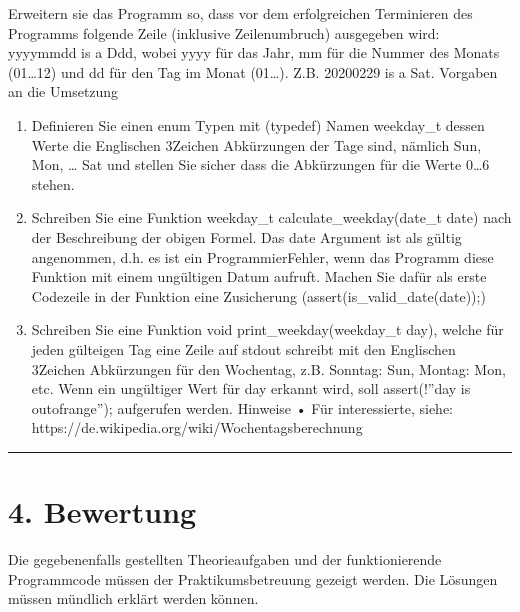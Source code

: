 \documentclass[a4paper,10pt,english]{report}
\begin{document}
\sphinxAtStartPar
Erweitern sie das Programm so, dass vor dem erfolgreichen Terminieren des Programms fol\sphinxhyphen{}gende Zeile (inklusive Zeilenumbruch) ausgegeben wird: yyyy\sphinxhyphen{}mm\sphinxhyphen{}dd is a Ddd, wobei yyyy für das Jahr, mm für die Nummer des Monats (01…12) und dd für den Tag im Monat (01…). Z.B. 2020\sphinxhyphen{}02\sphinxhyphen{}29 is a Sat.
Vorgaben an die Umsetzung
\begin{enumerate}
%
\item {} 
\sphinxAtStartPar
Definieren Sie einen enum Typen mit (typedef) Namen weekday\_t dessen Werte die Englischen 3\sphinxhyphen{}Zeichen Abkürzungen der Tage sind, nämlich Sun, Mon, … Sat und stel\sphinxhyphen{}len Sie sicher dass die Abkürzungen für die Werte 0…6 stehen.

\item {} 
\sphinxAtStartPar
Schreiben Sie eine Funktion weekday\_t calculate\_weekday(date\_t date) nach der Beschreibung der obigen Formel. Das date Argument ist als gültig angenom\sphinxhyphen{}men, d.h. es ist ein Programmier\sphinxhyphen{}Fehler, wenn das Programm diese Funktion mit einem ungültigen Datum aufruft. Machen Sie dafür als erste Codezeile in der Funktion eine Zu\sphinxhyphen{}sicherung (assert(is\_valid\_date(date));)

\item {} 
\sphinxAtStartPar
Schreiben Sie eine Funktion void print\_weekday(weekday\_t day), welche für jeden gülteigen Tag eine Zeile auf stdout schreibt mit den Englischen 3\sphinxhyphen{}Zeichen Ab\sphinxhyphen{}kürzungen für den Wochentag, z.B. Sonntag: Sun, Montag: Mon, etc. Wenn ein ungülti\sphinxhyphen{}ger Wert für day erkannt wird, soll assert(!”day is out\sphinxhyphen{}of\sphinxhyphen{}range”); aufgeru\sphinxhyphen{}fen werden.
Hinweise
•	Für interessierte, siehe: https://de.wikipedia.org/wiki/Wochentagsberechnung

\end{enumerate}


\bigskip\hrule\bigskip



\section{4. Bewertung}
\label{\detokenize{P02_Funktionen_Datentyp_enum/README:bewertung}}
\sphinxAtStartPar
Die gegebenenfalls gestellten Theorieaufgaben und der funktionierende Programmcode müssen der Praktikumsbetreuung gezeigt werden. Die Lösungen müssen mündlich erklärt werden können.
\end{document}
